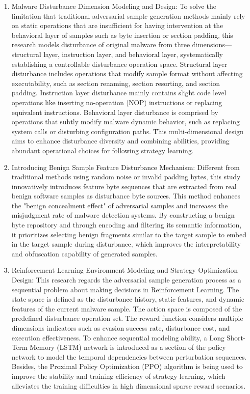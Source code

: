 \begin{enumerate} [label=\arabic*)] 
\item Malware Disturbance Dimension Modeling and Design: To solve the limitation that traditional adversarial sample generation methods mainly rely on static operations that are insufficient for having intervention at the behavioral layer of samples such as byte insertion or section padding, this research models disturbance of original malware from three dimensions—structural layer, instruction layer, and behavioral layer, systematically establishing a controllable disturbance operation space. Structural layer disturbance includes operations that modify sample format without affecting executability, such as section renaming, section resorting, and section padding. Instruction layer disturbance mainly contains slight code level operations like inserting no-operation (NOP) instructions or replacing equivalent instructions. Behavioral layer disturbance is comprised by operations that subtly modify malware dynamic behavior, such as replacing system calls or disturbing configuration paths. This multi-dimensional design aims to enhance disturbance diversity and combining abilities, providing abundant operational choices for following strategy learning.

\item Introducing Benign Sample Feature Disturbance Mechanism: Different from traditional methods using random noise or invalid padding bytes, this study innovatively introduces feature byte sequences that are extracted from real benign software samples as disturbance byte sources. This method enhances the "benign concealment effect" of adversarial samples and increases the misjudgment rate of malware detection systems. By constructing a benign byte repository and through encoding and filtering its semantic information, it prioritizes selecting benign fragments similar to the target sample to embed in the target sample during disturbance, which improves the interpretability and obfuscation capability of generated samples.

\item Reinforcement Learning Environment Modeling and Strategy Optimization Design: This research regards the adversarial sample generation process as a sequential problem about making decisions in Reinforcement Learning. The state space is defined as the disturbance history, static features, and dynamic features of the current malware sample. The action space is composed of the predefined disturbance operation set. The reward function considers multiple dimensions indicators such as evasion success rate, disturbance cost, and execution effectiveness. To enhance sequential modeling ability, a Long Short-Term Memory (LSTM) network is introduced as a section of the policy network to model the temporal dependencies between perturbation sequences. Besides, the Proximal Policy Optimization (PPO) algorithm is being used to improve the stability and training efficiency of strategy learning, which alleviates the training difficulties in high dimensional sparse reward scenarios.


\end{enumerate}
